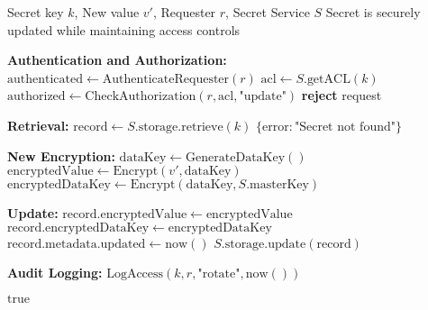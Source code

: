\begin{protocol}
\label{prot:secret-rotation}
\begin{algorithmic}[1]
\Require Secret key $k$, New value $v'$, Requester $r$, Secret Service $S$
\Ensure Secret is securely updated while maintaining access controls

\State \textbf{Authentication and Authorization:}
\State $\text{authenticated} \gets \text{AuthenticateRequester}(r)$
\State $\text{acl} \gets S.\text{getACL}(k)$
\State $\text{authorized} \gets \text{CheckAuthorization}(r, \text{acl}, \text{"update"})$
    \State \textbf{reject} request
\EndIf

\State \textbf{Retrieval:}
\State $\text{record} \gets S.\text{storage}.\text{retrieve}(k)$
    \State \Return $\{\text{error}: \text{"Secret not found"}\}$
\EndIf

\State \textbf{New Encryption:}
\State $\text{dataKey} \gets \text{GenerateDataKey}()$
\State $\text{encryptedValue} \gets \text{Encrypt}(v', \text{dataKey})$
\State $\text{encryptedDataKey} \gets \text{Encrypt}(\text{dataKey}, S.\text{masterKey})$

\State \textbf{Update:}
\State $\text{record}.\text{encryptedValue} \gets \text{encryptedValue}$
\State $\text{record}.\text{encryptedDataKey} \gets \text{encryptedDataKey}$
\State $\text{record}.\text{metadata}.\text{updated} \gets \text{now}()$
\State $S.\text{storage}.\text{update}(\text{record})$

\State \textbf{Audit Logging:}
\State $\text{LogAccess}(k, r, \text{"rotate"}, \text{now}())$

\State \Return $\text{true}$
\end{algorithmic}
\end{protocol}
